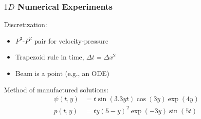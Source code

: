 \documentclass[8pt]{beamer}
\begin{document}
\begin{frame}
    \frametitle{\(1D\) Numerical Experiments}
    Discretization:
    \begin{itemize}
        \item \(P^3\)-\(P^2\) pair for velocity-pressure
        \item Trapezoid rule in time, \(\Delta t = \Delta x^2\)
        \item Beam is a point (e.g., an ODE)
    \end{itemize}
    \pause
    Method of manufactured solutions:
    \begin{align}
        \psi(t, y) &= t \sin(3.3 y t) \cos(3 y) \exp(4 y)                     \\
           p(t, y) &= t y (5 - y)^2 \exp(-3 y) \sin(5 t)
    \end{align}
\end{frame}
\end{document}
